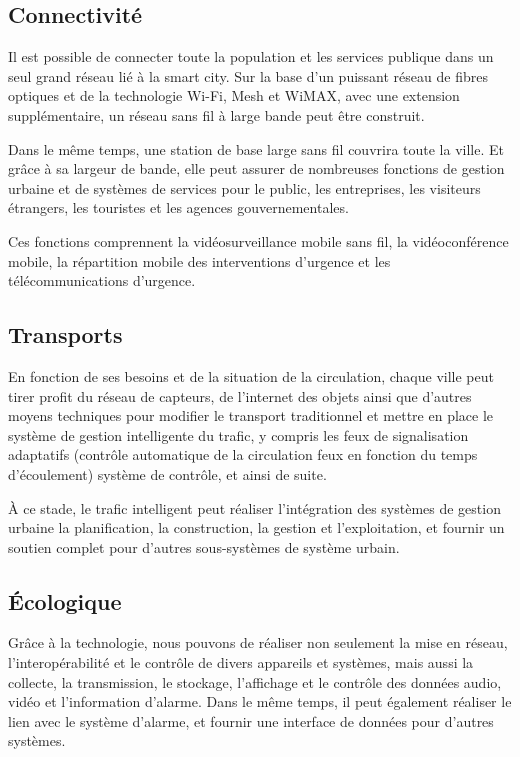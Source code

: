\subsection{Connectivité}
Il est possible de connecter toute la population et les services publique dans un
seul grand réseau lié à la smart city.
Sur la base d'un puissant réseau de fibres optiques et de la technologie Wi-Fi, Mesh et WiMAX,
avec une extension supplémentaire, un réseau sans fil à large bande peut être construit.

Dans le même temps, une station de base large sans fil couvrira toute la ville.
Et grâce à sa largeur de bande, elle peut assurer de nombreuses fonctions de gestion urbaine
et de systèmes de services pour le public, les entreprises, les visiteurs étrangers,
les touristes et les agences gouvernementales.

Ces fonctions comprennent la vidéosurveillance mobile sans fil, la vidéoconférence mobile,
la répartition mobile des interventions d'urgence et les télécommunications d'urgence.

\subsection{Transports}

En fonction de ses besoins et de la situation de la circulation,
chaque ville peut tirer profit du réseau de capteurs,
de l'internet des objets ainsi que d'autres moyens techniques pour modifier le transport
traditionnel et mettre en place le système de gestion intelligente du trafic,
y compris les feux de signalisation adaptatifs (contrôle automatique de la circulation
feux en fonction du temps d'écoulement) système de contrôle, et ainsi de suite.

À ce stade, le trafic intelligent peut réaliser l'intégration des systèmes
de gestion urbaine la planification, la construction, la gestion et l'exploitation, et fournir
un soutien complet pour d'autres sous-systèmes de système urbain.

\subsection{Écologique}

Grâce à la technologie, nous pouvons de réaliser non seulement la mise en réseau,
l'interopérabilité et le contrôle de divers appareils et systèmes, mais aussi la collecte,
la transmission, le stockage, l'affichage et le contrôle des données audio, vidéo et l'information d'alarme.
Dans le même temps, il peut également réaliser le lien avec le système d'alarme, et fournir
une interface de données pour d'autres systèmes.

